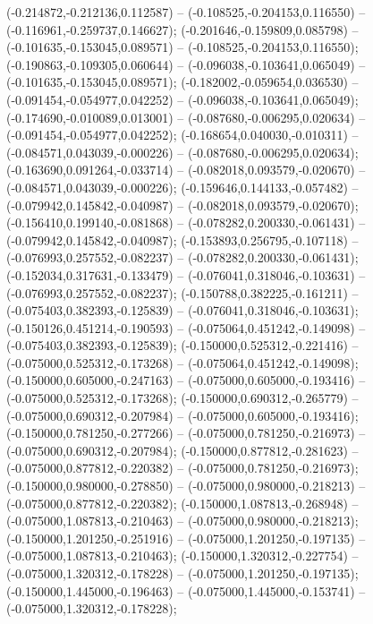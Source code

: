  (-0.214872,-0.212136,0.112587) -- (-0.108525,-0.204153,0.116550) -- (-0.116961,-0.259737,0.146627);
 (-0.201646,-0.159809,0.085798) -- (-0.101635,-0.153045,0.089571) -- (-0.108525,-0.204153,0.116550);
 (-0.190863,-0.109305,0.060644) -- (-0.096038,-0.103641,0.065049) -- (-0.101635,-0.153045,0.089571);
 (-0.182002,-0.059654,0.036530) -- (-0.091454,-0.054977,0.042252) -- (-0.096038,-0.103641,0.065049);
 (-0.174690,-0.010089,0.013001) -- (-0.087680,-0.006295,0.020634) -- (-0.091454,-0.054977,0.042252);
 (-0.168654,0.040030,-0.010311) -- (-0.084571,0.043039,-0.000226) -- (-0.087680,-0.006295,0.020634);
 (-0.163690,0.091264,-0.033714) -- (-0.082018,0.093579,-0.020670) -- (-0.084571,0.043039,-0.000226);
 (-0.159646,0.144133,-0.057482) -- (-0.079942,0.145842,-0.040987) -- (-0.082018,0.093579,-0.020670);
 (-0.156410,0.199140,-0.081868) -- (-0.078282,0.200330,-0.061431) -- (-0.079942,0.145842,-0.040987);
 (-0.153893,0.256795,-0.107118) -- (-0.076993,0.257552,-0.082237) -- (-0.078282,0.200330,-0.061431);
 (-0.152034,0.317631,-0.133479) -- (-0.076041,0.318046,-0.103631) -- (-0.076993,0.257552,-0.082237);
 (-0.150788,0.382225,-0.161211) -- (-0.075403,0.382393,-0.125839) -- (-0.076041,0.318046,-0.103631);
 (-0.150126,0.451214,-0.190593) -- (-0.075064,0.451242,-0.149098) -- (-0.075403,0.382393,-0.125839);
 (-0.150000,0.525312,-0.221416) -- (-0.075000,0.525312,-0.173268) -- (-0.075064,0.451242,-0.149098);
 (-0.150000,0.605000,-0.247163) -- (-0.075000,0.605000,-0.193416) -- (-0.075000,0.525312,-0.173268);
 (-0.150000,0.690312,-0.265779) -- (-0.075000,0.690312,-0.207984) -- (-0.075000,0.605000,-0.193416);
 (-0.150000,0.781250,-0.277266) -- (-0.075000,0.781250,-0.216973) -- (-0.075000,0.690312,-0.207984);
 (-0.150000,0.877812,-0.281623) -- (-0.075000,0.877812,-0.220382) -- (-0.075000,0.781250,-0.216973);
 (-0.150000,0.980000,-0.278850) -- (-0.075000,0.980000,-0.218213) -- (-0.075000,0.877812,-0.220382);
 (-0.150000,1.087813,-0.268948) -- (-0.075000,1.087813,-0.210463) -- (-0.075000,0.980000,-0.218213);
 (-0.150000,1.201250,-0.251916) -- (-0.075000,1.201250,-0.197135) -- (-0.075000,1.087813,-0.210463);
 (-0.150000,1.320312,-0.227754) -- (-0.075000,1.320312,-0.178228) -- (-0.075000,1.201250,-0.197135);
 (-0.150000,1.445000,-0.196463) -- (-0.075000,1.445000,-0.153741) -- (-0.075000,1.320312,-0.178228);
